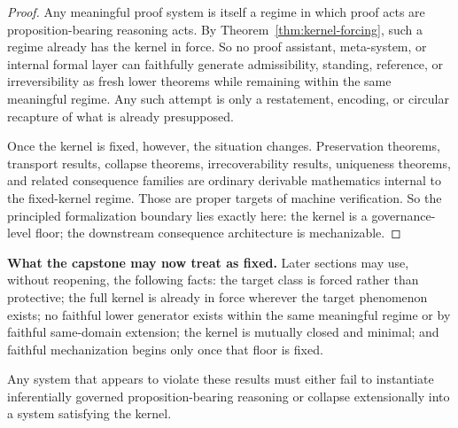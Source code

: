 \begin{proof}
Any meaningful proof system is itself a regime in which proof acts are proposition-bearing reasoning acts. By Theorem~\ref{thm:kernel-forcing}, such a regime already has the kernel in force. So no proof assistant, meta-system, or internal formal layer can faithfully generate admissibility, standing, reference, or irreversibility as fresh lower theorems while remaining within the same meaningful regime. Any such attempt is only a restatement, encoding, or circular recapture of what is already presupposed.

Once the kernel is fixed, however, the situation changes. Preservation theorems, transport results, collapse theorems, irrecoverability results, uniqueness theorems, and related consequence families are ordinary derivable mathematics internal to the fixed-kernel regime. Those are proper targets of machine verification. So the principled formalization boundary lies exactly here: the kernel is a governance-level floor; the downstream consequence architecture is mechanizable.\cite{MaleyFoundationalClosure}
\end{proof}

\begin{fixedbox}
\textbf{What the capstone may now treat as fixed.} Later sections may use, without reopening, the following facts: the target class is forced rather than protective; the full kernel is already in force wherever the target phenomenon exists; no faithful lower generator exists within the same meaningful regime or by faithful same-domain extension; the kernel is mutually closed and minimal; and faithful mechanization begins only once that floor is fixed.
\end{fixedbox}

Any system that appears to violate these results must either fail to instantiate inferentially governed proposition-bearing reasoning or collapse extensionally into a system satisfying the kernel.
